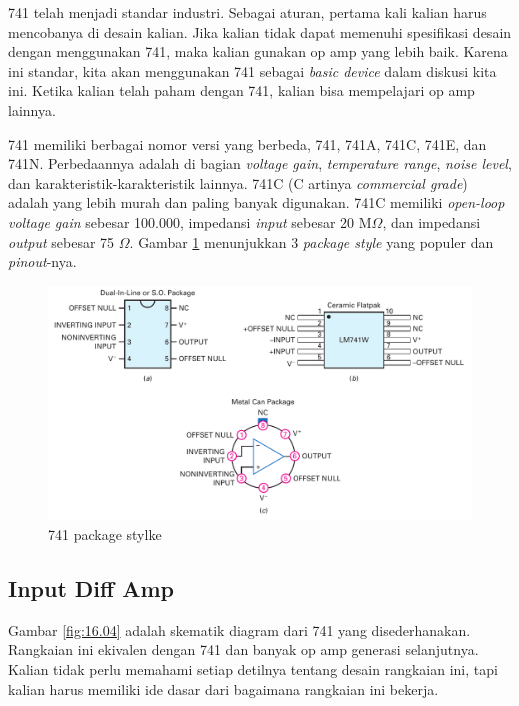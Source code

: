 741 telah menjadi standar industri. Sebagai aturan, pertama kali kalian harus mencobanya di desain kalian. Jika kalian tidak dapat memenuhi spesifikasi desain dengan menggunakan 741, maka kalian gunakan op amp yang lebih baik. Karena ini standar, kita akan menggunakan 741 sebagai \textit{basic device} dalam diskusi kita ini. Ketika kalian telah paham dengan 741, kalian bisa mempelajari op amp lainnya.

741 memiliki berbagai nomor versi yang berbeda, 741, 741A, 741C, 741E, dan 741N. Perbedaannya adalah di bagian \textit{voltage gain}, \textit{temperature range}, \textit{noise level}, dan karakteristik-karakteristik lainnya. 741C (C artinya \textit{commercial grade}) adalah yang lebih murah dan paling banyak digunakan. 741C memiliki \textit{open-loop voltage gain} sebesar 100.000, impedansi \textit{input} sebesar 20 M$\Omega$, dan impedansi \textit{output} sebesar 75 $\Omega$. Gambar \ref{fig:16.03} menunjukkan 3 \textit{package style} yang populer dan \textit{pinout}-nya.

\begin{figure}
	\centering
	\includegraphics[width=\linewidth]{pic/fig:16.03}
	\caption{741 package stylke}
	\label{fig:16.03}
\end{figure}


\subsection{Input Diff Amp}

Gambar \ref{fig:16.04} adalah skematik diagram dari 741 yang disederhanakan. Rangkaian ini ekivalen dengan 741 dan banyak op amp generasi selanjutnya. Kalian tidak perlu memahami setiap detilnya tentang desain rangkaian ini, tapi kalian harus memiliki ide dasar dari bagaimana rangkaian ini bekerja.

